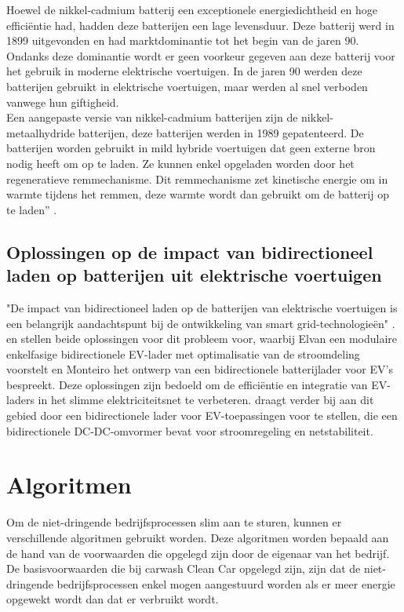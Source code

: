 Hoewel de nikkel-cadmium batterij een exceptionele energiedichtheid en hoge efficiëntie had, hadden deze batterijen een lage levensduur. Deze batterij werd in 1899 uitgevonden en had marktdominantie tot het begin van de jaren 90. Ondanks deze dominantie wordt er geen voorkeur gegeven aan deze batterij voor het gebruik in moderne elektrische voertuigen. In de jaren 90 werden deze batterijen gebruikt in elektrische voertuigen, maar werden al snel verboden vanwege hun giftigheid.\\
Een aangepaste versie van nikkel-cadmium batterijen zijn de nikkel-metaalhydride batterijen, deze batterijen werden in 1989 gepatenteerd. De batterijen worden gebruikt in mild hybride voertuigen dat geen externe bron nodig heeft om op te laden. Ze kunnen enkel opgeladen worden door het regeneratieve remmechanisme. Dit remmechanisme zet kinetische energie om in warmte tijdens het remmen, deze warmte wordt dan gebruikt om de batterij op te laden” \autocite{AnupKumarH2022}.

\subsection{Oplossingen op de impact van bidirectioneel laden op batterijen uit elektrische voertuigen}
\label{sec:stand-van-zaken-bidirectioneel-laden-oplossingen}

"De impact van bidirectioneel laden op de batterijen van elektrische voertuigen is een belangrijk aandachtspunt bij de ontwikkeling van smart grid-technologieën" \autocite{Dubarry2017}. \textcite{Elvan2017} en \textcite{Monteiro2013} stellen beide oplossingen voor dit probleem voor, waarbij Elvan een modulaire enkelfasige bidirectionele EV-lader met optimalisatie van de stroomdeling voorstelt en Monteiro het ontwerp van een bidirectionele batterijlader voor EV's bespreekt. Deze oplossingen zijn bedoeld om de efficiëntie en integratie van EV-laders in het slimme elektriciteitsnet te verbeteren. \textcite{Anuja2024} draagt verder bij aan dit gebied door een bidirectionele lader voor EV-toepassingen voor te stellen, die een bidirectionele DC-DC-omvormer bevat voor stroomregeling en netstabiliteit.

\section{Algoritmen}
\label{sec:stand-van-zaken-algoritmen}

Om de niet-dringende bedrijfsprocessen slim aan te sturen, kunnen er verschillende algoritmen gebruikt worden. Deze algoritmen worden bepaald aan de hand van de voorwaarden die opgelegd zijn door de eigenaar van het bedrijf. De basisvoorwaarden die bij carwash Clean Car opgelegd zijn, zijn dat de niet-dringende bedrijfsprocessen enkel mogen aangestuurd worden als er meer energie opgewekt wordt dan dat er verbruikt wordt.\\

